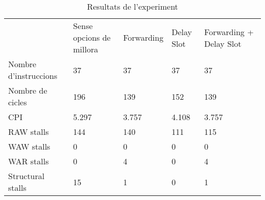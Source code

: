 \begin{table}
\centering
\begin{tabular}{lllll}
 & Sense opcions de millora &Forwarding  &Delay Slot  &Forwarding + Delay Slot   \\
 Nombre d'instruccions &37  &37  &37 &37  \\
 Nombre de cicles &196               &139  &152  &139   \\
 CPI &5.297               &3.757  &4.108  &3.757   \\
 RAW stalls &144 &140  &111  &115   \\
 WAW stalls &0 &0 &0 &0   \\
 WAR stalls &0 &4 &0 &4   \\
 Structural stalls &15 &1 &0 &1  
\end{tabular}
\caption{Resultats de l'experiment}
\label{tab:results}
\end{table}
